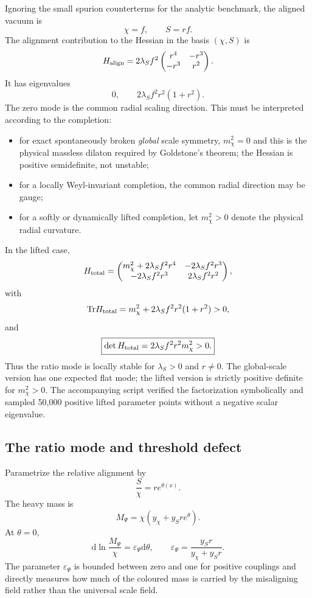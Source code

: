 \documentclass[11pt,a4paper]{article}
\newcommand{\dd}{\mathrm{d}}
\newcommand{\Tr}{\mathrm{Tr}}
\begin{document}
Ignoring the small spurion counterterms for the analytic benchmark, the aligned vacuum is
\[
\chi=f,
\qquad
S=rf.
\]
The alignment contribution to the Hessian in the basis $(\chi,S)$ is
\[
H_{\rm align}
=2\lambda_Sf^2
\begin{pmatrix}
r^4&-r^3\\
-r^3&r^2
\end{pmatrix}.
\label{eq:alignHessian}
\]
It has eigenvalues
\[
0,
\qquad
2\lambda_Sf^2r^2(1+r^2).
\]
The zero mode is the common radial scaling direction. This must be interpreted according to the completion:
\begin{itemize}
  \item for exact spontaneously broken \emph{global} scale symmetry, $m_\chi^2=0$ and this is the physical massless dilaton required by Goldstone's theorem; the Hessian is positive semidefinite, not unstable;
  \item for a locally Weyl-invariant completion, the common radial direction may be gauge;
  \item for a softly or dynamically lifted completion, let $m_\chi^2>0$ denote the physical radial curvature.
\end{itemize}
In the lifted case,
\[
H_{\rm total}
=
\begin{pmatrix}
m_\chi^2+2\lambda_Sf^2r^4&-2\lambda_Sf^2r^3\\
-2\lambda_Sf^2r^3&2\lambda_Sf^2r^2
\end{pmatrix},
\]
with
\[
\Tr H_{\rm total}
=m_\chi^2+2\lambda_Sf^2r^2(1+r^2)>0,
\]
and
\[
\boxed{
\det H_{\rm total}
=2\lambda_Sf^2r^2m_\chi^2>0.
}
\label{eq:positiveHessian}
\]
Thus the ratio mode is locally stable for $\lambda_S>0$ and $r\neq0$. The global-scale version has one expected flat mode; the lifted version is strictly positive definite for $m_\chi^2>0$. The accompanying script verified the factorization symbolically and sampled 50,000 positive lifted parameter points without a negative scalar eigenvalue.

\subsection{The ratio mode and threshold defect}

Parametrize the relative alignment by
\[
\frac{S}{\chi}=r e^{\theta(x)}.
\label{eq:theta}
\]
The heavy mass is
\[
M_\Psi
=\chi\left(y_\chi+y_Sr e^\theta\right).
\]
At $\theta=0$,
\[
\boxed{
\dd\ln\frac{M_\Psi}{\chi}
=\varepsilon_\Psi\dd\theta,
\qquad
\varepsilon_\Psi
=\frac{y_Sr}{y_\chi+y_Sr}.
}
\label{eq:epsilonpsi}
\]
The parameter $\varepsilon_\Psi$ is bounded between zero and one for positive couplings and directly measures how much of the coloured mass is carried by the misaligning field rather than the universal scale field.
\end{document}
